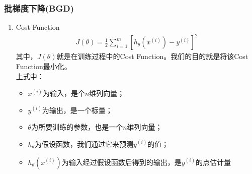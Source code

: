 \subsubsection{批梯度下降(BGD)}
\begin{enumerate}
	\item Cost Function
	\begin{equation}\begin{aligned}
		J(\theta) = \frac{1}{2} \sum_{i=1}^m \left[h_{\theta} {(x^{(i)})} - y^{(i)}\right]^2
	\end{aligned}\end{equation}
	其中，$J(\theta)$就是在训练过程中的Cost Function。我们的目的就是将该Cost Function最小化。\\
	上式中：
	\begin{itemize}
		\item $x^{(i)}$为输入，是个$n$维列向量；
		\item $y^{(i)}$为输出，是一个标量；
		\item $\theta$为所要训练的参数，也是一个$n$维列向量；
		\item $h_{\theta}$为假设函数，我们通过它来预测$y^{(i)}$的值；
		\item $h_{\theta} {(x^{(i)})}$为输入经过假设函数后得到的输出，是$y^{(i)}$的点估计量
	\end{itemize}


\end{enumerate}
